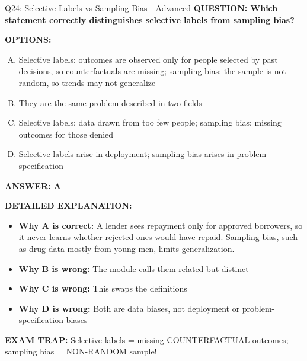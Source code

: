 \documentclass[8pt]{beamer}
\begin{document}
\begin{frame}[shrink=6]{Q24: Selective Labels vs Sampling Bias - Advanced}
\fontsize{6.5}{7.5}\selectfont
\textbf{QUESTION: Which statement correctly distinguishes selective labels from sampling bias?}

\vspace{0.1cm}
\textbf{OPTIONS:}
\begin{enumerate}[A.]
\item Selective labels: outcomes are observed only for people selected by past decisions, so counterfactuals are missing; sampling bias: the sample is not random, so trends may not generalize
\item They are the same problem described in two fields
\item Selective labels: data drawn from too few people; sampling bias: missing outcomes for those denied
\item Selective labels arise in deployment; sampling bias arises in problem specification
\end{enumerate}

\vspace{0.1cm}
\textcolor{myblue}{\textbf{ANSWER: A}}

\vspace{0.1cm}
\textbf{DETAILED EXPLANATION:}
\begin{itemize}
\item \textbf{Why A is correct:} A lender sees repayment only for approved borrowers, so it never learns whether rejected ones would have repaid. Sampling bias, such as drug data mostly from young men, limits generalization.
\item \textbf{Why B is wrong:} The module calls them related but distinct
\item \textbf{Why C is wrong:} This swaps the definitions
\item \textbf{Why D is wrong:} Both are data biases, not deployment or problem-specification biases
\end{itemize}

\textcolor{myred}{\textbf{EXAM TRAP:}} Selective labels = missing COUNTERFACTUAL outcomes; sampling bias = NON-RANDOM sample!
\end{frame}
\end{document}
